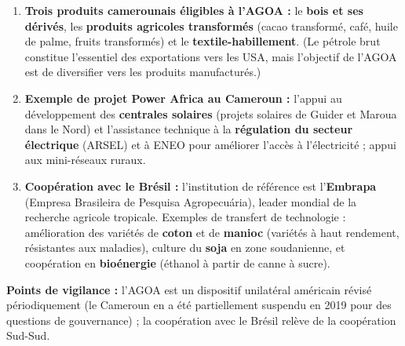 \documentclass[11pt]{article}
\newcommand{\cle}[1]{{\popxbold\color{popdark}#1}}
\begin{document}
\begin{corrige}
\begin{enumerate}
\item \textbf{Trois produits camerounais éligibles à l'AGOA :} le \textbf{bois et ses dérivés}, les \textbf{produits agricoles transformés} (cacao transformé, café, huile de palme, fruits transformés) et le \textbf{textile-habillement}. (Le pétrole brut constitue l'essentiel des exportations vers les USA, mais l'objectif de l'AGOA est de diversifier vers les produits manufacturés.)
\item \textbf{Exemple de projet Power Africa au Cameroun :} l'appui au développement des \textbf{centrales solaires} (projets solaires de Guider et Maroua dans le Nord) et l'assistance technique à la \textbf{régulation du secteur électrique} (ARSEL) et à ENEO pour améliorer l'accès à l'électricité ; appui aux mini-réseaux ruraux.
\item \textbf{Coopération avec le Brésil :} l'institution de référence est l'\textbf{Embrapa} (Empresa Brasileira de Pesquisa Agropecuária), leader mondial de la recherche agricole tropicale. Exemples de transfert de technologie : amélioration des variétés de \textbf{coton} et de \textbf{manioc} (variétés à haut rendement, résistantes aux maladies), culture du \textbf{soja} en zone soudanienne, et coopération en \textbf{bioénergie} (éthanol à partir de canne à sucre).
\end{enumerate}
\textbf{Points de vigilance :} l'AGOA est un dispositif unilatéral américain révisé périodiquement (le Cameroun en a été partiellement suspendu en 2019 pour des questions de gouvernance) ; la coopération avec le Brésil relève de la coopération \cle{Sud-Sud}.
\end{corrige}
\end{document}
